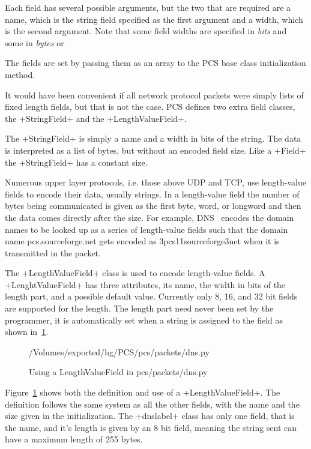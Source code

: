 \documentclass[11pt]{article}
\begin{document}
Each field has several possible arguments, but the two that are
required are a name, which is the string field specified as the first
argument and a width, which is the second argument.  Note that some
field widths are specified in \emph{bits} and some in \emph{bytes} or

The fields are set by passing them as an array to the PCS base class
initialization method.

It would have been convenient if all network protocol packets were
simply lists of fixed length fields, but that is not the case.  PCS
defines two extra field classes, the \class+StringField+ and the
\class+LengthValueField+.

The \class+StringField+ is simply a name and a width in bits of the
string.  The data is interpreted as a list of bytes, but without an
encoded field size.  Like a \class+Field+ the \class+StringField+ has
a constant size.

Numerous upper layer protocols, i.e. those above UDP and TCP, use
length-value fields to encode their data, usually strings.  In a
length-value field the number of bytes being communicated is given as
the first byte, word, or longword and then the data comes directly
after the size.  For example, DNS~\cite{rfc1035} encodes the domain
names to be looked up as a series of length-value fields such that the
domain name pcs.sourceforge.net gets encoded as 3pcs11sourceforge3net
when it is transmitted in the packet.

The \class+LengthValueField+ class is used to encode length-value
fields.  A \class+LenghtValueField+ has three attributes, its name,
the width in bits of the length part, and a possible default value.
Currently only 8, 16, and 32 bit fields are supported for the length.
The length part need never been set by the programmer, it is
automatically set when a string is assigned to the field as shown
in~\ref{fig:using-a-length-value-field}.

\begin{figure}
  \centering
{/Volumes/exported/hg/PCS/pcs/packets/dns.py}
  \caption{Using a LengthValueField in pcs/packets/dns.py}
  \label{fig:using-a-length-value-field}
\end{figure}

Figure~\ref{fig:using-a-length-value-field} shows both the definition
and use of a \class+LengthValueField+.  The definition follows the
same system as all the other fields, with the name and the size given
in the initialization.  The \class+dnslabel+ class has only one field,
that is the name, and it's length is given by an 8 bit field, meaning
the string sent can have a maximum length of 255 bytes.  
\end{document}
